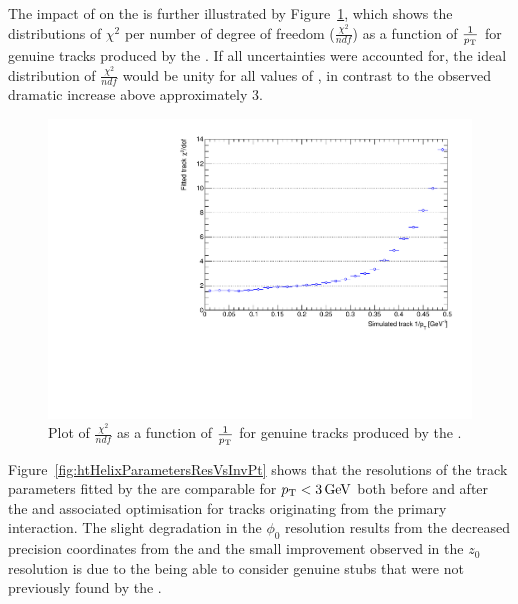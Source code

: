 The impact of \MS on the \KF is further illustrated by Figure~\ref{fig:2GeVFlatChi2Ndf}, which shows the distributions of $\chi^{2}$ per number of degree of freedom ($\frac{\chi^{2}}{ndf}$) as a function of $\frac{1}{p_{\mathrm{T}}}$ for genuine tracks produced by the \KF.
If all uncertainties were accounted for, the ideal distribution of $\frac{\chi^{2}}{ndf}$ would be unity for all values of \pT, in contrast to the observed dramatic increase above approximately 3\GeV.

\begin{figure}[htb]
\centering
\includegraphics[width=\textwidth]{figs/tk-upgrade/results-lowPtTracking/kfChi2NdfVsInvPtFlatGeometry_5000.pdf}
\caption{Plot of $\frac{\chi^{2}}{ndf}$ as a function of $\frac{1}{p_{\mathrm{T}}}$ for genuine tracks produced by the \KF.}
\label{fig:2GeVFlatChi2Ndf}
\end{figure}

Figure~\ref{fig:htHelixParametersResVsInvPt} shows that the resolutions of the track parameters fitted by the \KF are comparable for $p_{\mathrm{T}} < 3\,\text{Ge\hspace{-.08em}V}$ both before and after the \HT and associated \KF optimisation for tracks originating from the primary interaction.
The slight degradation in the $\phi_{0}$ resolution results from the decreased precision coordinates from the \HT and the small improvement observed in the $z_{0}$ resolution is due to the \KF being able to consider genuine stubs that were not previously found by the \HT.

